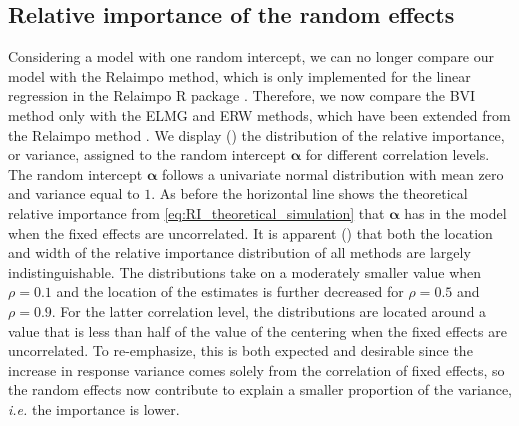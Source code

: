 \subsection{Relative importance of the random effects}
\label{sec:relimp_random}
Considering a model with one random intercept, we can no longer compare our model with the Relaimpo method, which is only implemented for the linear regression in the Relaimpo R package \citep{gromping_relaimpo}. Therefore, we now compare the BVI method only with the ELMG and ERW methods, which have been extended from the Relaimpo method \citep{matre}.
We display () the distribution of the relative importance, or variance, assigned to the random intercept $\boldsymbol{\alpha}$ for different correlation levels. 
The random intercept $\boldsymbol{\alpha}$ follows a univariate normal distribution with mean zero and variance equal to $1$.
As before the horizontal line shows the theoretical relative importance from \eqref{eq:RI_theoretical_simulation} that $\boldsymbol{\alpha}$ has in the model when the fixed effects are uncorrelated.
\newline
\newline
It is apparent () that both the location and width of the relative importance distribution of all methods are largely indistinguishable. 
The distributions take on a moderately smaller value when $\rho=0.1$ and the location of the estimates is further decreased for $\rho=0.5$ and $\rho=0.9$. 
For the latter correlation level, the distributions are located around a value that is less than half of the value of the centering when the fixed effects are uncorrelated. 
To re-emphasize, this is both expected and desirable since the increase in response variance comes solely from the correlation of fixed effects, so the random effects now contribute to explain a smaller proportion of the variance, \textit{i.e.} the importance is lower.
